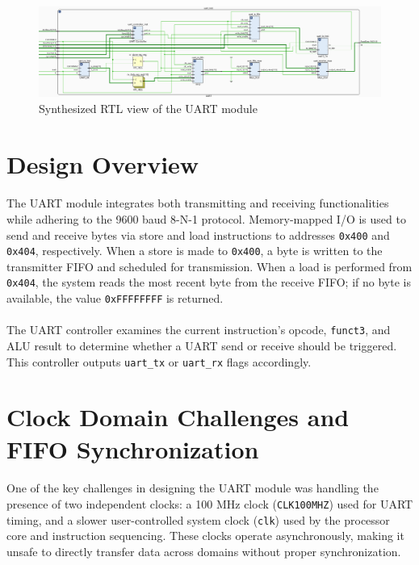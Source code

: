 \documentclass[12pt]{report}
\begin{document}
\begin{figure}[h]
    \centering
    \includegraphics[width=\textwidth]{figures/uart_rtl.png}
    \caption{Synthesized RTL view of the UART module}
    \label{fig:uart}
\end{figure}

\section{Design Overview}

\paragraph{}
The UART module integrates both transmitting and receiving functionalities while adhering to the 9600 baud 8-N-1 protocol. Memory-mapped I/O is used to send and receive bytes via store and load instructions to addresses \texttt{0x400} and \texttt{0x404}, respectively. When a store is made to \texttt{0x400}, a byte is written to the transmitter FIFO and scheduled for transmission. When a load is performed from \texttt{0x404}, the system reads the most recent byte from the receive FIFO; if no byte is available, the value \texttt{0xFFFFFFFF} is returned.

\paragraph{}
The UART controller examines the current instruction's opcode, \texttt{funct3}, and ALU result to determine whether a UART send or receive should be triggered. This controller outputs \texttt{uart\_tx} or \texttt{uart\_rx} flags accordingly.

\section{Clock Domain Challenges and FIFO Synchronization}

\paragraph{}
One of the key challenges in designing the UART module was handling the presence of two independent clocks: a 100 MHz clock (\texttt{CLK100MHZ}) used for UART timing, and a slower user-controlled system clock (\texttt{clk}) used by the processor core and instruction sequencing. These clocks operate asynchronously, making it unsafe to directly transfer data across domains without proper synchronization.
\end{document}
